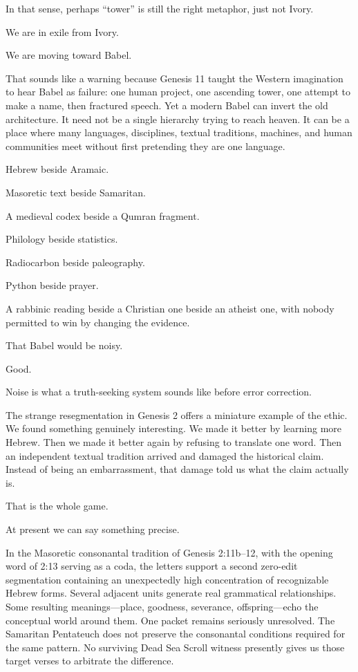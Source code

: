 In that sense, perhaps ``tower'' is still the right metaphor, just not Ivory.

We are in exile from Ivory.

We are moving toward Babel.

That sounds like a warning because Genesis 11 taught the Western imagination to hear Babel as failure: one human project, one ascending tower, one attempt to make a name, then fractured speech. Yet a modern Babel can invert the old architecture. It need not be a single hierarchy trying to reach heaven. It can be a place where many languages, disciplines, textual traditions, machines, and human communities meet without first pretending they are one language.

Hebrew beside Aramaic.

Masoretic text beside Samaritan.

A medieval codex beside a Qumran fragment.

Philology beside statistics.

Radiocarbon beside paleography.

Python beside prayer.

A rabbinic reading beside a Christian one beside an atheist one, with nobody permitted to win by changing the evidence.

That Babel would be noisy.

Good.

Noise is what a truth-seeking system sounds like before error correction.

The strange resegmentation in Genesis 2 offers a miniature example of the ethic. We found something genuinely interesting. We made it better by learning more Hebrew. Then we made it better again by refusing to translate one word. Then an independent textual tradition arrived and damaged the historical claim. Instead of being an embarrassment, that damage told us what the claim actually is.

That is the whole game.

At present we can say something precise.

In the Masoretic consonantal tradition of Genesis 2:11b--12, with the opening word of 2:13 serving as a coda, the letters support a second zero-edit segmentation containing an unexpectedly high concentration of recognizable Hebrew forms. Several adjacent units generate real grammatical relationships. Some resulting meanings---place, goodness, severance, offspring---echo the conceptual world around them. One packet remains seriously unresolved. The Samaritan Pentateuch does not preserve the consonantal conditions required for the same pattern. No surviving Dead Sea Scroll witness presently gives us those target verses to arbitrate the difference.\cite{MasoreticGenesis,BDB,SamaritanGenesis,Tov2012}

